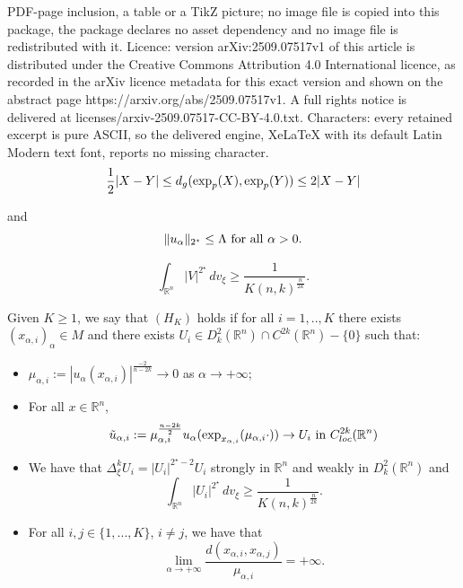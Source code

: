 \documentclass[10pt,a4paper]{amsart}
\def \crit {2^\star}
\def \mai {\mu_{\alpha,i}}
\def \rn {\mathbb{R}^n}
\def \tuai {\tilde{u}_{\alpha,i}}
\def \ua {u_\alpha}
\def \xai {x_{\alpha,i}}
\def \xaj {x_{\alpha,j}}
\begin{document}
PDF-page inclusion, a table or a TikZ picture; no image file is copied into this package, the package declares no asset dependency and no image file is redistributed with it. Licence: version arXiv:2509.07517v1 of this article is distributed under the Creative Commons Attribution 4.0 International licence, as recorded in the arXiv licence metadata for this exact version and shown on the abstract page https://arxiv.org/abs/2509.07517v1. A full rights notice is delivered at licenses/arxiv-2509.07517-CC-BY-4.0.txt. Characters: every retained excerpt is pure ASCII, so the delivered engine, XeLaTeX with its default Latin Modern text font, reports no missing character.
\begin{equation}\label{lem:lip}
\frac{1}{2}|X-Y|\leq d_g(\hbox{exp}_p(X),\hbox{exp}_p(Y))\leq 2|X-Y|
\end{equation}

and \begin{equation}\label{hyp:bnd:nrj:pf}
\Vert\ua\Vert_{\crit} \leq \Lambda \hbox{ for all }\alpha>0.
\end{equation} 

\begin{equation}\label{min:nrj:U}
\int_{\rn}|V|^{\crit}\, dv_\xi\geq \frac{1}{K(n,k)^{\frac{n}{2k}}}.
\end{equation}

\begin{defi} Given $K\geq 1$, we say that $(H_{K})$ holds if for all $i=1,..,K$ there exists $(\xai)_\alpha\in M$ and there exists $U_i\in D_k^2(\rn)\cap C^{2k}(\rn)-\{0\}$ such that:
\begin{itemize}
\item $\mai:=|\ua(\xai)|^{\frac{-2}{n-2k}}\to 0$ as  $\alpha\to +\infty$;
\item For all $x\in\rn$,
\begin{equation}\label{cv:tuai}
\tuai :=\mai^{\frac{n-2k}{2}}\ua(\hbox{exp}_{\xai}(\mai \cdot))\to U_i\hbox{ in }C^{2k}_{loc}(\rn)
\end{equation}
\item We have that $\Delta_\xi^k U_i=|U_i|^{\crit-2}U_i$ strongly in $\rn$ and weakly in $D_k^2(\rn)$ and
\begin{equation*}
\int_{\rn}|U_i|^{\crit}\, dv_\xi\geq \frac{1}{K(n,k)^{\frac{n}{2k}}}.
\end{equation*}
\item For all $i,j\in \{1,...,K\}$, $i\neq j$, we have that
\begin{equation}\label{lim:d:infty}
\lim_{\alpha\to +\infty}\frac{d(\xai,\xaj)}{\mai}=+\infty.
\end{equation}
\end{itemize}
\end{defi}
\end{document}
